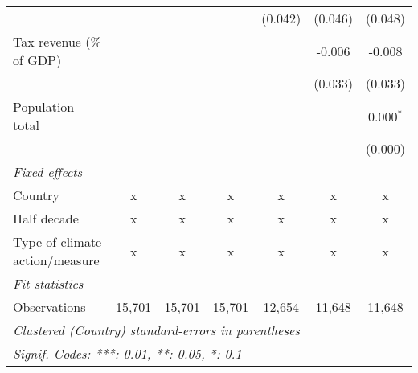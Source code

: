 \begin{tabular}{lcccccc}
                                                             &         &         &              & (0.042)      & (0.046)       & (0.048)\\   
   Tax revenue (\% of GDP)                                   &         &         &              &              & -0.006        & -0.008\\   
                                                             &         &         &              &              & (0.033)       & (0.033)\\   
   Population total                                          &         &         &              &              &               & 0.000$^{*}$\\   
                                                             &         &         &              &              &               & (0.000)\\   
   \emph{Fixed effects}\\
   Country                                                   & x       & x       & x            & x            & x             & x\\  
   Half decade                                               & x       & x       & x            & x            & x             & x\\  
   Type of climate action/measure                            & x       & x       & x            & x            & x             & x\\  
   \midrule \emph{Fit statistics}\\
   Observations                                              & 15,701  & 15,701  & 15,701       & 12,654       & 11,648        & 11,648\\  
   \midrule
   \multicolumn{7}{l}{\emph{Clustered (Country) standard-errors in parentheses}}\\
   \multicolumn{7}{l}{\emph{Signif. Codes: ***: 0.01, **: 0.05, *: 0.1}}\\
\end{tabular}
\par\endgroup


